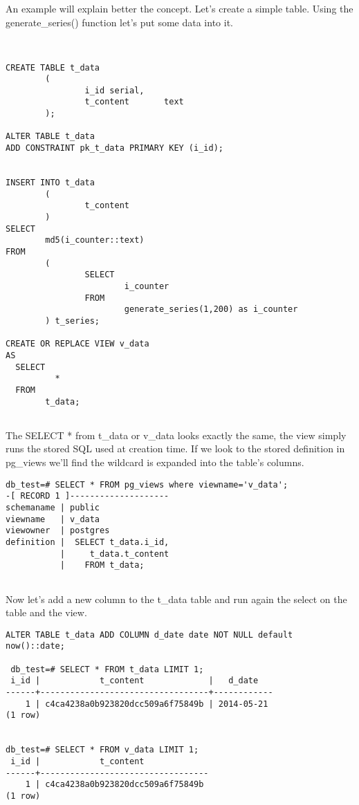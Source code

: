 An example will explain better the concept. Let's create a simple table. Using 
the generate\_series() function let's put some data into it.

\begin{lstlisting}[style=pgsql]


CREATE TABLE t_data 
        ( 
                i_id serial,
                t_content       text
        );

ALTER TABLE t_data 
ADD CONSTRAINT pk_t_data PRIMARY KEY (i_id);


INSERT INTO t_data
        (
                t_content
        )
SELECT
        md5(i_counter::text)
FROM
        (
                SELECT
                        i_counter
                FROM
                        generate_series(1,200) as i_counter
        ) t_series;

CREATE OR REPLACE VIEW v_data 
AS 
  SELECT 
          *
  FROM 
        t_data;


\end{lstlisting}

The SELECT * from t\_data or v\_data looks exactly the same, the view 
simply runs the stored SQL used at creation time.
If we look to the stored definition in pg\_views we'll find the wildcard is 
expanded into the table's columns.


\begin{lstlisting}[style=pgsql]
 db_test=# SELECT * FROM pg_views where viewname='v_data';
-[ RECORD 1 ]--------------------
schemaname | public
viewname   | v_data
viewowner  | postgres
definition |  SELECT t_data.i_id,
           |     t_data.t_content
           |    FROM t_data;


\end{lstlisting}

Now let's add a new column to the t\_data table and run again the select on the 
table and the view.

\begin{lstlisting}[style=pgsql]
 ALTER TABLE t_data ADD COLUMN d_date date NOT NULL default now()::date;
 
 db_test=# SELECT * FROM t_data LIMIT 1;
 i_id |            t_content             |   d_date   
------+----------------------------------+------------
    1 | c4ca4238a0b923820dcc509a6f75849b | 2014-05-21
(1 row)


db_test=# SELECT * FROM v_data LIMIT 1;
 i_id |            t_content             
------+----------------------------------
    1 | c4ca4238a0b923820dcc509a6f75849b
(1 row)


 
\end{lstlisting}

